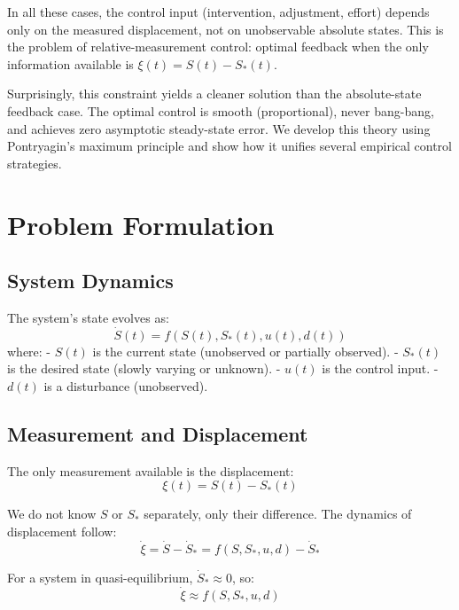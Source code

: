 \documentclass[12pt]{article}
\begin{document}
In all these cases, the control input (intervention, adjustment, effort) depends only on the measured displacement, not on unobservable absolute states. This is the problem of relative-measurement control: optimal feedback when the only information available is $\xi(t) = S(t) - S_*(t)$.

Surprisingly, this constraint yields a cleaner solution than the absolute-state feedback case. The optimal control is smooth (proportional), never bang-bang, and achieves zero asymptotic steady-state error. We develop this theory using Pontryagin's maximum principle and show how it unifies several empirical control strategies.

\section{Problem Formulation}

\subsection{System Dynamics}

The system's state evolves as:
\begin{equation}
\dot{S}(t) = f(S(t), S_*(t), u(t), d(t))
\end{equation}
where:
- $S(t)$ is the current state (unobserved or partially observed).
- $S_*(t)$ is the desired state (slowly varying or unknown).
- $u(t)$ is the control input.
- $d(t)$ is a disturbance (unobserved).

\subsection{Measurement and Displacement}

The only measurement available is the displacement:
\begin{equation}
\xi(t) = S(t) - S_*(t)
\end{equation}

We do not know $S$ or $S_*$ separately, only their difference. The dynamics of displacement follow:
\begin{equation}
\dot{\xi} = \dot{S} - \dot{S}_* = f(S, S_*, u, d) - \dot{S}_*
\end{equation}

For a system in quasi-equilibrium, $\dot{S}_* \approx 0$, so:
\begin{equation}
\dot{\xi} \approx f(S, S_*, u, d)
\end{equation}
\end{document}
